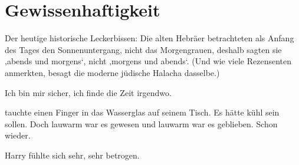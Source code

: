 \chapter{Gewissenhaftigkeit}

\begin{chapterOpeningAuthorNote}
%
Der heutige historische Leckerbissen: Die alten Hebräer betrachteten als Anfang des Tages den Sonnenuntergang, nicht das Morgengrauen, deshalb sagten sie ‚abends und morgens‘, nicht ‚morgens und abends‘. (Und wie viele Rezensenten anmerkten, besagt die moderne jüdische Halacha dasselbe.)
\end{chapterOpeningAuthorNote}
\begin{chapterOpeningQuote}
Ich bin mir sicher, ich finde die Zeit irgendwo.
\end{chapterOpeningQuote}

{}

 tauchte einen Finger in das Wasserglas auf seinem Tisch. Es hätte kühl sein sollen. Doch lauwarm war es gewesen und lauwarm war es geblieben. Schon wieder.

Harry fühlte sich sehr, sehr betrogen.

